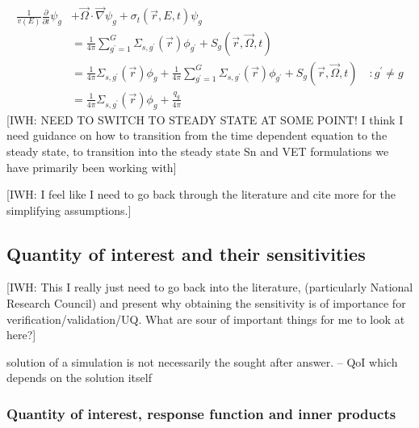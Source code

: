 \documentclass{article}
\newcommand{\vr}{\vec{r}}
\newcommand{\vO}{\vec{\Omega}}
\newcommand{\vgrad}{\vec{\nabla}}
\newcommand{\sigt}{\sigma_t}
\begin{document}
\begin{equation}
\begin{split}
\frac{1}{v(E)} \frac{\partial}{\partial t}\psi_g &+ \vO \cdot \vgrad \psi_g + \sigt(\vr,E,t) \psi_g \\
&= \frac{1}{4 \pi} \sum_{g^\prime=1}^G  \Sigma_{s,g^\prime}(\vr) \phi_{g^\prime} + S_g(\vr,\vO,t) \\
&= \frac{1}{4 \pi} \Sigma_{s,g^\prime}(\vr) \phi_{g}
+ \frac{1}{4 \pi} \sum_{g^\prime=1}^G  \Sigma_{s,g^\prime}(\vr) \phi_{g^\prime} + S_g(\vr,\vO,t)  \quad :g^\prime \neq g\\
&= \frac{1}{4 \pi} \Sigma_{s,g^\prime}(\vr) \phi_{g}
+ \frac{q_g}{4 \pi}\
\end{split}
\end{equation}
{\color{red}[IWH: NEED TO SWITCH TO STEADY STATE AT SOME POINT! I think I need guidance on how to transition from the time dependent equation to the steady state, to transition into the steady state Sn and VET formulations we have primarily been working with]}

{\color{red}[IWH: I feel like I need to go back through the literature and cite more for the simplifying assumptions.]}

\subsection{Quantity of interest and their sensitivities}

{\color{red}[IWH: This I really just need to go back into the literature, (particularly National Research Council) and present why obtaining the sensitivity is of importance for verification/validation/UQ. What are sour of important things for me to look at here?]}

solution of a simulation is not necessarily the sought after answer. -- QoI which depends on the solution itself

\subsubsection{Quantity of interest, response function and inner products}
\end{document}
